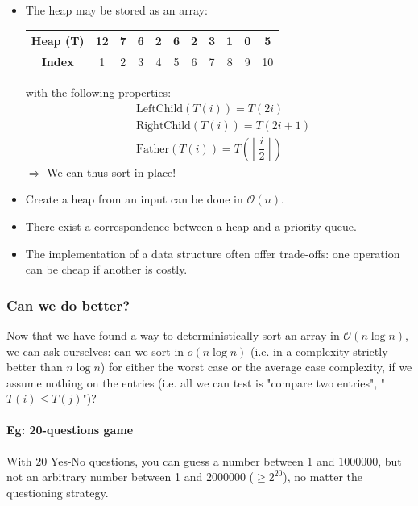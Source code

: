 \documentclass[11pt,a4paper]{article}
\begin{document}
\begin{itemize}
\item The heap may be stored as an array: \\
\begin{center}
\begin{tabular}{|c|c|c|c|c|c|c|c|c|c|c|}
   \hline
   \textbf{Heap (T)} & 12 & 7 & 6 & 2 & 6 & 2 & 3 & 1 & 0 & 5 \\
   \hline 
   \textbf{Index} & 1 & 2 & 3 & 4 & 5 & 6 & 7 & 8 & 9 & 10 \\
   \hline
\end{tabular}
\end{center} 
\vspace*{0.4 cm} 
with the following properties:
\begin{align*}
& \text{LeftChild}(T(i)) = T(2i) \\
& \text{RightChild}(T(i)) = T(2i+1) \\
& \text{Father}(T(i)) = T\left( \left\lfloor\dfrac{i}{2}\right\rfloor \right)
\end{align*}
$\Rightarrow $ We can thus sort in place!

\item Create a heap from an input can be done in $\mathcal{O}(n)$.
\item There exist a correspondence between a heap and a priority queue.
\item The implementation of a data structure often offer trade-offs: one operation can be cheap if another is costly. 
\end{itemize}

\subsubsection*{Can we do better?}

Now that we have found a way to deterministically sort an array in $\mathcal{O}(n\log n)$, we can ask ourselves: can we sort in $o(n \log n)$ (i.e. in a complexity strictly better than $n \log n$) for either the worst case or the average case complexity, if we assume nothing on the entries (i.e. all we can test is "compare two entries", "$T(i) \leq T(j)$")?

\paragraph*{Eg: 20-questions game} With $20$ Yes-No questions, you can guess a number between 1 and $1000000$, but not an arbitrary number between 1 and $2000000$ ($\geq 2^{20}$), no matter the questioning strategy.
\end{document}
